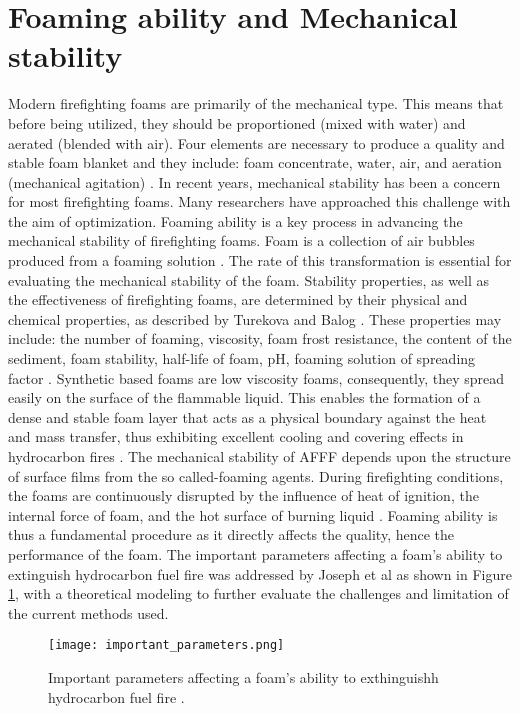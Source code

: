 \section{Foaming ability and Mechanical stability}
Modern firefighting foams are primarily of the mechanical type. This means that before being utilized, they should be proportioned (mixed with water) and aerated (blended with air). Four elements are necessary to produce a quality and stable foam blanket and they include: foam concentrate, water, air, and aeration (mechanical agitation) \cite{oguike2013study}.
In recent years, mechanical stability has been a concern for most firefighting foams. Many researchers have approached this challenge with the aim of optimization. Foaming ability is a key process in advancing the mechanical stability of firefighting foams. Foam is a collection of air bubbles produced from a foaming solution \cite{oguike2013study}. The rate of this transformation is essential for evaluating the mechanical stability of the foam. Stability properties, as well as the effectiveness of firefighting foams, are determined by their physical and chemical properties, as described by Turekova and Balog \cite{turekova2011environmental}. These properties may include: the number of foaming, viscosity, foam frost resistance, the content of the sediment, foam stability, half-life of foam, pH, foaming solution of spreading factor \cite{turekova2011environmental}.
Synthetic based foams are low viscosity foams, consequently, they spread easily on the surface of the flammable liquid. This enables the formation of a dense and stable foam layer that acts as a physical boundary against the heat and mass transfer, thus exhibiting excellent cooling and covering effects in hydrocarbon fires \cite{xu2020fire}. The mechanical stability of AFFF depends upon the structure of surface films from the so called-foaming agents. During firefighting conditions, the foams are continuously disrupted by the influence of heat of ignition, the internal force of foam, and the hot surface of burning liquid \cite{turekova2011environmental}. Foaming ability is thus a fundamental procedure as it directly affects the quality, hence the performance of the foam. The important parameters affecting a foam's ability to extinguish hydrocarbon fuel fire was addressed by Joseph et al \cite{scheffey1995evaluating} as shown in Figure \ref{ch2:figure:parameters}, with a theoretical modeling to further evaluate the challenges and limitation of the current methods used. 

\begin{figure}[H]
    \centering
    \texttt{[image: important\_parameters.png]}
    \caption{Important parameters affecting a foam's ability to exthinguishh hydrocarbon fuel fire \cite{scheffey1995evaluating}.}
    \label{ch2:figure:parameters}
\end{figure}

